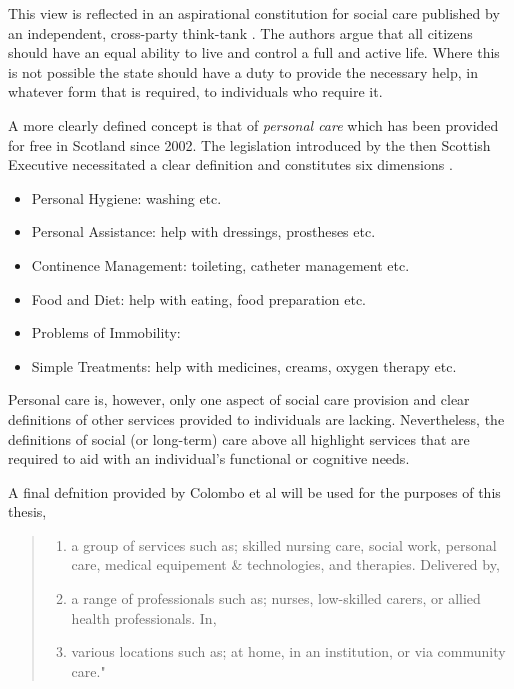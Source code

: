 \documentclass[12pt,]{report}
\begin{document}
This view is reflected in an aspirational constitution for social care
published by an independent, cross-party think-tank \citep{RN136}. The
authors argue that all citizens should have an equal ability to live and
control a full and active life. Where this is not possible the state
should have a duty to provide the necessary help, in whatever form that
is required, to individuals who require it.

A more clearly defined concept is that of \emph{personal care} which has
been provided for free in Scotland since 2002. The legislation
introduced by the then Scottish Executive necessitated a clear
definition and constitutes six dimensions \citep[pp.256]{RN373}.

\begin{itemize}[noitemsep]
\item Personal Hygiene: washing etc.  
\item Personal Assistance: help with dressings, prostheses etc.  
\item Continence Management: toileting, catheter management etc.  
\item Food and Diet: help with eating, food preparation etc.  
\item Problems of Immobility:  
\item Simple Treatments: help with medicines, creams, oxygen therapy etc. 
\end{itemize}

Personal care is, however, only one aspect of social care provision and
clear definitions of other services provided to individuals are lacking.
Nevertheless, the definitions of social (or long-term) care above all
highlight services that are required to aid with an individual's
functional or cognitive needs.

A final defnition provided by Colombo et al\citeyearpar{RN414} will be
used for the purposes of this thesis,

\begin{quotation}
\begin{enumerate}[noitemsep, label={\alph*)}]
\item a group of services such as; skilled nursing care, social work, personal care, medical equipement \& technologies, and therapies. Delivered by,   
\item a range of  professionals such as; nurses, low-skilled carers, or allied health professionals. In,  
\item various locations such as; at home, in an institution, or via community care."
\end{enumerate}
\end{quotation}
\end{document}
